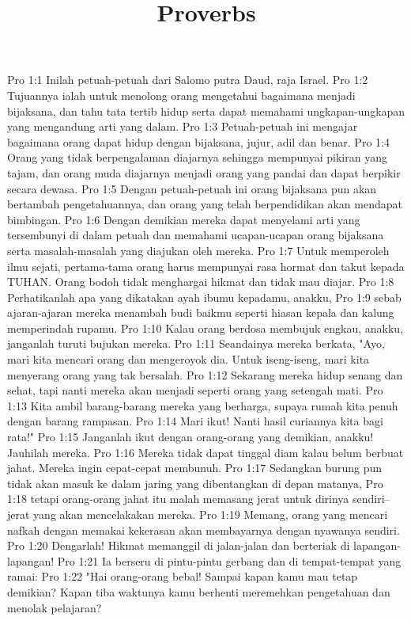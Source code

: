 

\title{Proverbs}

Pro 1:1  Inilah petuah-petuah dari Salomo putra Daud, raja Israel.
Pro 1:2  Tujuannya ialah untuk menolong orang mengetahui bagaimana menjadi bijaksana, dan tahu tata tertib hidup serta dapat memahami ungkapan-ungkapan yang mengandung arti yang dalam.
Pro 1:3  Petuah-petuah ini mengajar bagaimana orang dapat hidup dengan bijaksana, jujur, adil dan benar.
Pro 1:4  Orang yang tidak berpengalaman diajarnya sehingga mempunyai pikiran yang tajam, dan orang muda diajarnya menjadi orang yang pandai dan dapat berpikir secara dewasa.
Pro 1:5  Dengan petuah-petuah ini orang bijaksana pun akan bertambah pengetahuannya, dan orang yang telah berpendidikan akan mendapat bimbingan.
Pro 1:6  Dengan demikian mereka dapat menyelami arti yang tersembunyi di dalam petuah dan memahami ucapan-ucapan orang bijaksana serta masalah-masalah yang diajukan oleh mereka.
Pro 1:7  Untuk memperoleh ilmu sejati, pertama-tama orang harus mempunyai rasa hormat dan takut kepada TUHAN. Orang bodoh tidak menghargai hikmat dan tidak mau diajar.
Pro 1:8  Perhatikanlah apa yang dikatakan ayah ibumu kepadamu, anakku,
Pro 1:9  sebab ajaran-ajaran mereka menambah budi baikmu seperti hiasan kepala dan kalung memperindah rupamu.
Pro 1:10  Kalau orang berdosa membujuk engkau, anakku, janganlah turuti bujukan mereka.
Pro 1:11  Seandainya mereka berkata, "Ayo, mari kita mencari orang dan mengeroyok dia. Untuk iseng-iseng, mari kita menyerang orang yang tak bersalah.
Pro 1:12  Sekarang mereka hidup senang dan sehat, tapi nanti mereka akan menjadi seperti orang yang setengah mati.
Pro 1:13  Kita ambil barang-barang mereka yang berharga, supaya rumah kita penuh dengan barang rampasan.
Pro 1:14  Mari ikut! Nanti hasil curiannya kita bagi rata!"
Pro 1:15  Janganlah ikut dengan orang-orang yang demikian, anakku! Jauhilah mereka.
Pro 1:16  Mereka tidak dapat tinggal diam kalau belum berbuat jahat. Mereka ingin cepat-cepat membunuh.
Pro 1:17  Sedangkan burung pun tidak akan masuk ke dalam jaring yang dibentangkan di depan matanya,
Pro 1:18  tetapi orang-orang jahat itu malah memasang jerat untuk dirinya sendiri--jerat yang akan mencelakakan mereka.
Pro 1:19  Memang, orang yang mencari nafkah dengan memakai kekerasan akan membayarnya dengan nyawanya sendiri.
Pro 1:20  Dengarlah! Hikmat memanggil di jalan-jalan dan berteriak di lapangan-lapangan!
Pro 1:21  Ia berseru di pintu-pintu gerbang dan di tempat-tempat yang ramai:
Pro 1:22  "Hai orang-orang bebal! Sampai kapan kamu mau tetap demikian? Kapan tiba waktunya kamu berhenti meremehkan pengetahuan dan menolak pelajaran?
